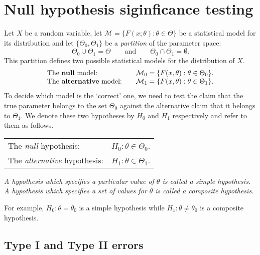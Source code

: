 
\section{Null hypothesis siginficance testing}\label{sec:nhst}

Let $X$ be a random variable, let $\mathcal{M}=\{F(x;\theta):\theta\in\Theta\}$ be a statistical model for its distribution and let $\{\Theta_0, \Theta_1\}$ be a \emph{partition} of the parameter space:
\[
\Theta_0\cup\Theta_1 = \Theta \qquad\text{and}\qquad \Theta_0\cap\Theta_1 = \emptyset.
\]
This partition defines two possible statistical models for the distribution of $X$.
\[
\begin{array}{ll}
\text{The \emph{null} model:}			&\quad\mathcal{M}_0	 =\{F(x,\theta):\theta\in\Theta_0\}.	\\
\text{The \emph{alternative} model:}	&\quad\mathcal{M}_1	 =\{F(x,\theta):\theta\in\Theta_1\}.
\end{array}
\]
To decide which model is the `correct' one, we need to test the claim that the true parameter belongs to the set $\Theta_0$ against the alternative claim that it belongs to $\Theta_1$. We denote these two hypotheses by $H_0$ and $H_1$ respectively and refer to them as follows.

\begin{center}
\begin{tabular}{ll} \hline
The \emph{null} hypothesis:		& \quad $H_0: \theta\in\Theta_0$. \\
The \emph{alternative} hypothesis:	& \quad $H_1: \theta\in\Theta_1$. \\ \hline
\end{tabular}
\end{center}

\begin{definition}
\bit
\it A hypothesis which specifies a particular value of $\theta$ is called a \emph{simple hypothesis}.
\it A hypothesis which specifies a set of values for $\theta$ is called a \emph{composite hypothesis}.
\eit
\end{definition}

For example, $H_0:\theta = \theta_0$ is a simple hypothesis while $H_1:\theta\neq\theta_0$ is a composite hypothesis.

\subsection{Type I and Type II errors}

